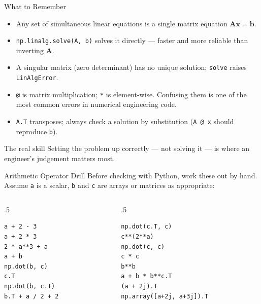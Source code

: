 \documentclass[9pt,aspectratio=169,xcolor=table]{beamer}
\begin{document}
\begin{frame}{What to Remember}
    \leavevmode
    \small
    \begin{itemize}\itemsep3pt
        \item Any set of simultaneous linear equations is a single
              matrix equation $\mathbf{A}\mathbf{x} = \mathbf{b}$.
        \item \texttt{np.linalg.solve(A, b)} solves it directly ---
              faster and more reliable than inverting $\mathbf{A}$.
        \item A \alert{singular} matrix (zero determinant) has no
              unique solution; \texttt{solve} raises \texttt{LinAlgError}.
        \item \texttt{@} is \alert{matrix} multiplication; \texttt{*} is
              \alert{element-wise}. Confusing them is one of the most
              common errors in numerical engineering code.
        \item \texttt{A.T} transposes; always check a solution by
              substitution (\texttt{A @ x} should reproduce \texttt{b}).
    \end{itemize}

    \vspace{3mm}
    \begin{alertblock}{The real skill}
        Setting the problem up correctly --- not solving it --- is
        where an engineer's judgement matters most.
    \end{alertblock}
\end{frame}

\begin{frame}[fragile]{Arithmetic Operator Drill}
    \leavevmode
    \small
    Before checking with Python, work these out by hand. Assume
    \texttt{a} is a scalar, \texttt{b} and \texttt{c} are arrays or
    matrices as appropriate:

    \begin{columns}[t]
        \begin{column}{.5\textwidth}
\begin{lstlisting}
a + 2 - 3
a + 2 * 3
2 * a**3 + a
a + b
np.dot(b, c)
c.T
np.dot(b, c.T)
b.T + a / 2 + 2
\end{lstlisting}
        \end{column}
        \begin{column}{.5\textwidth}
\begin{lstlisting}
np.dot(c.T, c)
c**(2**a)
np.dot(c, c)
c * c
b**b
a + b * b**c.T
(a + 2j).T
np.array([a+2j, a+3j]).T
\end{lstlisting}
        \end{column}
    \end{columns}
\end{frame}
\end{document}
